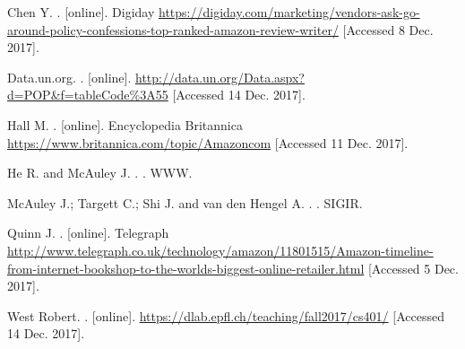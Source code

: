\documentclass[11pt]{article}
\begin{document}
\begin{thebibliography}{}

Chen Y.
.
 [online].
\newblock Digiday
\newblock \url{https://digiday.com/marketing/vendors-ask-go-around-policy-confessions-top-ranked-amazon-review-writer/} [Accessed 8 Dec. 2017].

Data.un.org.
.
 [online].
\newblock \url{http://data.un.org/Data.aspx?d=POP&f=tableCode%3A55} [Accessed 14 Dec. 2017].

Hall M.
.
 [online].
\newblock Encyclopedia Britannica
\newblock \url{https://www.britannica.com/topic/Amazoncom} [Accessed 11 Dec. 2017].

He R. and McAuley J.
.
.
\newblock WWW.

McAuley J.; Targett C.; Shi J. and van den Hengel  A.
.
.
\newblock SIGIR.

Quinn J.
.
 [online].
\newblock Telegraph
\newblock \url{http://www.telegraph.co.uk/technology/amazon/11801515/Amazon-timeline-from-internet-bookshop-to-the-worlds-biggest-online-retailer.html} [Accessed 5 Dec. 2017].


West Robert.
.
 [online].
\newblock \url{https://dlab.epfl.ch/teaching/fall2017/cs401/} [Accessed 14 Dec. 2017].

\end{thebibliography}
\end{document}
